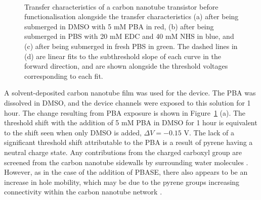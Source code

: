\documentclass[
  a4paper,
]{scrbook}
\begin{document}
\begin{figure}
\begin{minipage}[t]{0.45\linewidth}
{{}

}

\end{minipage}%
%
\begin{minipage}[t]{0.01\linewidth}

{\centering 

~

}

\end{minipage}%

\caption[Transfer characteristics of a carbon nanotube transistor,
before and after functionalisation with PBA or PBA/EDC/NHS, as well as
after submersion in fresh PBS, alongside linear fits to the subthreshold
slope of each curve in the forward
direction.]{\label{fig-pba-functionalisation-threshold-shift}Transfer
characteristics of a carbon nanotube transistor before functionalisation
alongside the transfer characteristics (a) after being submerged in DMSO
with 5 mM PBA in red, (b) after being submerged in PBS with 20 mM EDC
and 40 mM NHS in blue, and (c) after being submerged in fresh PBS in
green. The dashed lines in (d) are linear fits to the subthreshold slope
of each curve in the forward direction, and are shown alongside the
threshold voltages corresponding to each fit.}

\end{figure}

A solvent-deposited carbon nanotube film was used for the device. The
PBA was dissolved in DMSO, and the device channels were exposed to this
solution for 1 hour. The change resulting from PBA exposure is shown in
Figure~\ref{fig-pba-functionalisation-threshold-shift} (a). The
threshold shift with the addition of 5 mM PBA in DMSO for 1 hour is
equivalent to the shift seen when only DMSO is added,
\(\Delta V = -0.15\) V. The lack of a significant threshold shift
attributable to the PBA is a result of pyrene having a neutral charge
state. Any contributions from the charged carboxyl group are screened
from the carbon nanotube sidewalls by surrounding water molecules
\autocite{Lerner2012}. However, as in the case of the addition of PBASE,
there also appears to be an increase in hole mobility, which may be due
to the pyrene groups increasing connectivity within the carbon nanotube
network \autocite{Murugathas2019a}.
\end{document}
